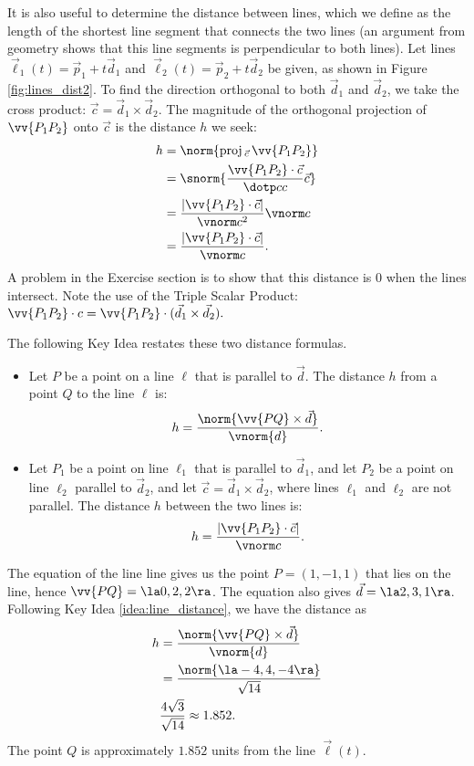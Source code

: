 It is also useful to determine the distance between lines, which we define as the length of the shortest line segment that connects the two lines (an argument from geometry shows that this line segments is perpendicular to both lines). Let lines $\vec\ell_1(t) = \vec p_1 + t\vec d_1$ and $\vec\ell_2(t) = \vec p_2 + t\vec d_2$ be given, as shown in Figure \ref{fig:lines_dist2}. To find the direction orthogonal to both $\vec d_1$ and $\vec d_2$, we take the cross product: $\vec c = \vec d_1\times \vec d_2$. The magnitude of the orthogonal projection of $\vv{P_1P_2}$ onto $\vec c$ is the distance $h$ we seek:
\begin{align*}
h&=		\norm{\text{proj}\,_{\vec c}\,\vv{P_1P_2}}\\
	&= \snorm{\frac{\vv{P_1P_2}\cdot\vec c}{\dotp cc}\vec c}\\
	&=\frac{|\vv{P_1P_2}\cdot \vec c|}{\vnorm c^2}\vnorm c\\
	&=\frac{|\vv{P_1P_2}\cdot \vec c|}{\vnorm c}.
\end{align*}
A problem in the Exercise section is to show that this distance is 0 when the lines intersect. Note the use of the Triple Scalar Product: $\vv{P_1P_2}\cdot c = \vv{P_1P_2}\cdot (\vec d_1\times \vec d_2).$


The following Key Idea restates these two distance formulas.

{\begin{itemize}
	\item Let $P$ be a point on a line $\ell$ that is parallel to $\vec d$. The distance $h$ from a point $Q$ to the line $\ell$ is:
	$$h =\frac{\norm{\vv{PQ}\times \vec d}}{\vnorm{d}}.$$
	\item	Let $P_1$ be a point on line $\ell_1$ that is parallel to $\vec d_1$, and let $P_2$ be a point on line $\ell_2$ parallel to $\vec d_2$, and let $\vec c = \vec d_1\times \vec d_2$, where lines $\ell_1$ and $\ell_2$ are not parallel. The distance $h$ between the two lines is:
	$$h=\frac{|\vv{P_1P_2}\cdot \vec c|}{\vnorm c}.$$
\end{itemize}
}

{The equation of the line line gives us the point $P=(1,-1,1)$ that lies on the line, hence $\vv{PQ} = \la 0,2,2\ra$. The equation also gives $\vec d= \la 2,3,1\ra$. Following Key Idea \ref{idea:line_distance}, we have the distance as 
\begin{align*}
h &= \frac{\norm{\vv{PQ}\times \vec d}}{\vnorm{d}}\\
	&= \frac{\norm{\la -4,4,-4\ra}}{\sqrt{14}}\\
	&\frac{4\sqrt{3}}{\sqrt{14}} \approx 1.852.
\end{align*}
The point $Q$ is approximately $1.852$ units from the line $\vec\ell(t)$.
}\\

